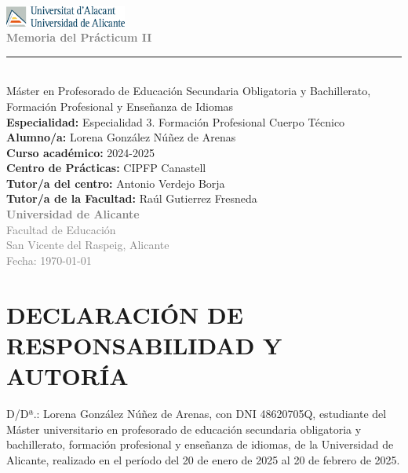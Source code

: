 \documentclass[a4paper,12pt]{report}
\begin{document}
\begin{titlepage}
    \begin{center}
        \vspace*{2cm}
        
        \includegraphics[width=0.3\textwidth]{resources/logo_ua.png}\\[1cm]
        
        \textcolor{gray}{\Huge \textbf{Memoria del Prácticum II}}\\[1cm]
        \rule{10cm}{0.4mm} \\[1cm]
        
        {\Large Máster en Profesorado de Educación Secundaria Obligatoria y Bachillerato, Formación Profesional y Enseñanza de Idiomas}\\[1cm]
        
        \textbf{Especialidad:} Especialidad 3. Formación Profesional Cuerpo Técnico\\[0.5cm]
        \textbf{Alumno/a:} Lorena González Núñez de Arenas\\[0.5cm]
        \textbf{Curso académico:} 2024-2025\\[0.5cm]
        \textbf{Centro de Prácticas:} CIPFP Canastell\\[0.5cm]
        \textbf{Tutor/a del centro:} Antonio Verdejo Borja\\[0.5cm]
        \textbf{Tutor/a de la Facultad:} Raúl Gutierrez Fresneda\\[0.5cm]
        
        \vfill
        \textcolor{gray}{\Large \textbf{Universidad de Alicante}}\\
        \textcolor{gray}{Facultad de Educación}\\
        \textcolor{gray}{San Vicente del Raspeig, Alicante}\\
        \textcolor{gray}{Fecha: \today}
    \end{center}
\end{titlepage}


\newpage
\section*{DECLARACIÓN DE RESPONSABILIDAD Y AUTORÍA}
D/Dª.: Lorena González Núñez de Arenas, con DNI 48620705Q, 
estudiante del Máster universitario en profesorado de educación secundaria obligatoria y bachillerato, formación profesional y enseñanza de idiomas, 
de la Universidad de Alicante, realizado en el período del 20 de enero de 2025 al 20 de febrero de 2025. \\
\end{document}
